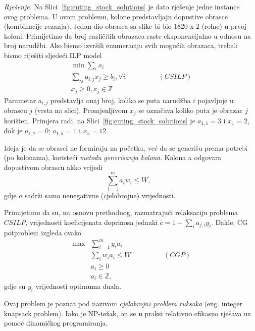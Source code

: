 \documentclass[a4paper, utf8, 11pt, colorlinks]{book}
\theoremstyle{definition}
\begin{document}
 \emph{Rješenje.} Na Slici~\ref{fig:cuting_stock_solutions} je dato rješenje jedne instance ovog problema. 
 U ovom problemu, kolone predstavljaju dopustive obrasce (kombinacije rezanja). Jedan dio obrasca sa slike bi bio $1820$ x $2$ (rolne) u prvoj koloni.
 Primijetimo da broj različitih obrazaca raste eksponencijalno u odnosu na broj narudžbi.  Ako bismo izvršili enumeraciju svih mogućih obrazaca, trebali bismo riješiti sljedeći ILP model
 \begin{align*}
      & \min \sum_{i} x_i \\
      & \sum_{ij} a_{i,j }x_j \geq b_i, \forall i \hspace{2cm} (CSILP)\\
      &  x_j \geq 0, x_{j} \in \mathbb{Z} 
 \end{align*}
 Parametar $a_{i,j}$ predstavlja onaj broj, koliko se puta  narudžba $i$ pojavljuje u obrascu $j$ (vrsta na slici). Promjenljivom $x_j$ se označava koliko puta je obrazac $j$ korišten. Primjera radi, na  Slici~\ref{fig:cuting_stock_solutions} je $a_{1,1}=3$ i $x_1 = 2$, dok je $a_{1,2}=0$; $a_{1,5}=1$ i $ x_5 = 12$.
 
 Ideja je da se obrasci ne formiraju na početku, već da se generišu prema potrebi (po kolonama), koristeći \emph{metodu generisanja kolona}. Kolona $a$ odgovara dopustivom obrascu akko vrijedi 
 $$ \sum_{i=1}^m a_i w_i \leq W,$$
 gdje $a$ sadrži samo nenegativne (cjelobrojne) vrijednosti. 
 
Primijetimo da su, na osnovu prethodnog, razmatrajući relaksaciju problema  $CSILP$, vrijednosti koeficijenata doprinosa 
jednaki $\overline{c} = 1 - \sum_{i} a_{j,i} y_i$.  
 Dakle, CG potproblem izgleda ovako
$$ \begin{array}{lll}
     &\max& \sum_{i=1}^m y_i a_i \\
     &  &\sum_{i} w_i a_i \leq W \hspace{2cm} (CGP)\\
     & &a_i \geq 0 \\
     & &a_i \in \mathbb{Z},
 \end{array}$$
  gdje su $y_i$ vrijednosti optimuma duala. 
  
 Ovaj problem je poznat pod nazivom \emph{cjelobrojni problem ruksaka} (eng. integer knapsack problem). Iako je NP-težak, on se u praksi relativno efikasno rješava  uz pomoć dinamičkog programiranja. 
 
\end{document}
